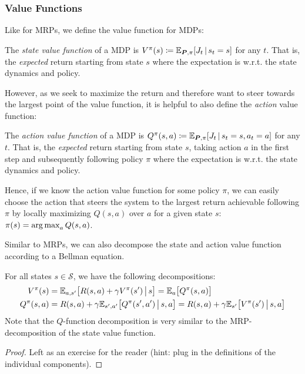 			\subsubsection{Value Functions}
				Like for \acp{MRP}, we define the value function for \acp{MDP}:
				\begin{definition}
					The \emph{state value function} of a \ac{MDP} is \( V^\pi(s) \coloneqq \mathbb{E}_{\bm{P}, \pi}[J_t \,\vert\, s_t = s] \) for any \(t\). That is, the \emph{expected} return starting from state \(s\) where the expectation is w.r.t. the state dynamics and policy.
				\end{definition}
				However, as we seek to maximize the return and therefore want to steer towards the largest point of the value function, it is helpful to also define the \emph{action} value function:
				\begin{definition}
					The \emph{action value function} of a \ac{MDP} is \( Q^\pi(s, a) \coloneqq \mathbb{E}_{\bm{P}, \pi}[J_t \,\vert\, s_t = s, a_t = a] \) for any \(t\). That is, the \emph{expected} return starting from state \(s\), taking action \(a\) in the first step and subsequently following policy \(\pi\) where the expectation is w.r.t. the state dynamics and policy.
				\end{definition}
				Hence, if we know the action value function for some policy \(\pi\), we can easily choose the action that steers the system to the largest return achievable following \(\pi\) by locally maximizing \(Q(s, a)\) over \(a\) for a given state \(s\): \( \pi(s) = \operatorname*{arg\,max}_a Q(s, a) \).

				Similar to \acp{MRP}, we can also decompose the state and action value function according to a Bellman equation.

				\begin{theorem}
					For all states \(s \in \mathcal{S}\), we have the following decompositions:
					\begin{align}
						V^\pi(s) &= \mathbb{E}_{a, s'}\bigl[ R(s, a) + \gamma V^\pi(s') \,\big\vert\, s \bigr] = \mathbb{E}_{a}\bigl[ Q^\pi(s, a) \bigr] \\
						Q^\pi(s, a) &= R(s, a) + \gamma \mathbb{E}_{s', a'} \bigl[ Q^\pi(s', a') \,\big\vert\, s, a \bigr] = R(s, a) + \gamma \mathbb{E}_{s'}\bigl[ V^\pi(s') \,\big\vert\, s, a \bigr]  \label{eq:bellmanExpEqQ}
					\end{align}
					Note that the \(Q\)-function decomposition is very similar to the \ac{MRP}-decomposition of the state value function.
				\end{theorem}
				\begin{proof}
					Left as an exercise for the reader (hint: plug in the definitions of the individual components).
				\end{proof}

